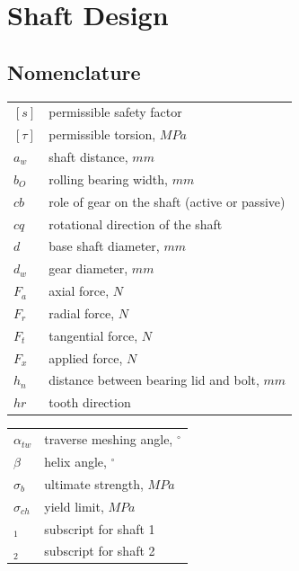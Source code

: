 \chapter{Shaft Design}
\section{Nomenclature}
\begin{tabular}[t]{lp{6.5cm}}
	$ [s] $ & permissible safety factor\\
	$ [\tau] $ & permissible torsion, $ \unit{MPa} $\\
	$ a_w $ & shaft distance, $ \unit{mm} $\\
	$ b_O $ & rolling bearing width, $ \unit{mm}$\\
	$ cb $ & role of gear on the shaft (active or passive)\\
	$ cq $ & rotational direction of the shaft\\
	$ d $ & base shaft diameter, $ \unit{mm} $\\
	$ d_w $ & gear diameter, $ \unit{mm} $\\
	$ F_a $ & axial force, $ \unit{N} $\\
	$ F_r $ & radial force, $ \unit{N} $\\
	$ F_t $ & tangential force, $ \unit{N} $\\
	$ F_x $ & applied force, $ \unit{N} $\\
	$ h_n $ & distance between bearing lid and bolt, $ \unit{mm} $\\
	$ hr $ & tooth direction\\
	
\end{tabular}
\begin{tabular}[t]{lp{6.5cm}}
	$ \alpha_{tw} $ & traverse meshing angle, $ ^\circ $\\
	$ \beta $ & helix angle, $ ^\circ $\\
	$ \sigma_b $ & ultimate strength, $ \unit{MPa} $\\
	$ \sigma_{ch} $ & yield limit, $ \unit{MPa} $\\
	$ _1 $ & subscript for shaft 1\\
	$ _2 $ & subscript for shaft 2\\
\end{tabular}\newpage

